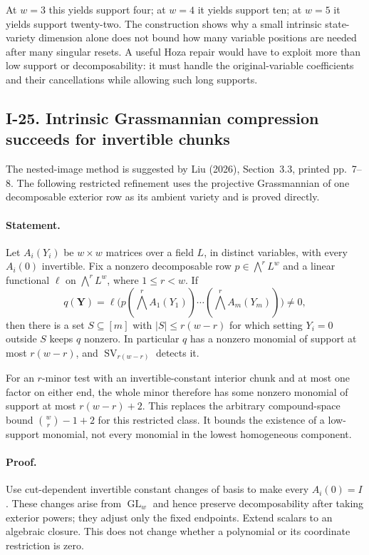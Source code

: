\documentclass[11pt,a4paper]{article}
\theoremstyle{definition}\newtheorem{definition}{Definition}
\begin{document}
At $w=3$ this yields support four; at $w=4$ it yields support
ten; at $w=5$ it yields support twenty-two.  The construction
shows why a small intrinsic state-variety dimension alone does
not bound how many variable positions are needed after many
singular resets.  A useful Hoza repair would have to exploit
more than low support or decomposability: it must handle the
original-variable coefficients and their cancellations while
allowing such long supports.


\subsection{I-25. Intrinsic Grassmannian compression succeeds for invertible chunks}
\label{I-25}

The nested-image method is suggested by Liu (2026), Section~3.3,
printed pp.~7--8.  The following restricted refinement uses
the projective Grassmannian of one decomposable exterior row
as its ambient variety and is proved directly.

\paragraph{Statement.}
Let $A_i(Y_i)$ be $w\times w$ matrices over a field $L$, in
distinct variables, with every $A_i(0)$ invertible.  Fix a
nonzero decomposable row $p\in\bigwedge^r L^w$ and a linear
functional $\ell$ on $\bigwedge^rL^w$, where $1\le r<w$.
If
\[
 q(\mathbf Y)=\ell\bigl(p(\textstyle\bigwedge^r A_1(Y_1))
                  \cdots(\textstyle\bigwedge^r A_m(Y_m))\bigr)
 \ne0,
\]
then there is a set $S\subseteq[m]$ with
$|S|\le r(w-r)$ for which setting $Y_i=0$ outside $S$
keeps $q$ nonzero.  In particular $q$ has a nonzero monomial
of support at most $r(w-r)$, and $\operatorname{SV}_{r(w-r)}$
detects it.

For an $r$-minor test with an invertible-constant interior
chunk and at most one factor on either end, the whole minor
therefore has some nonzero monomial of support at most
$r(w-r)+2$.  This replaces the arbitrary compound-space bound
$\binom wr-1+2$ for this restricted class.  It bounds the
existence of a low-support monomial, not every monomial in the
lowest homogeneous component.

\paragraph{Proof.}
Use cut-dependent invertible constant changes of basis to make
every $A_i(0)=I$.  These changes arise from $\operatorname{GL}_w$
and hence preserve decomposability after taking exterior powers;
they adjust only the fixed endpoints.  Extend scalars to an
algebraic closure.  This does not change whether a polynomial
or its coordinate restriction is zero.
\end{document}
